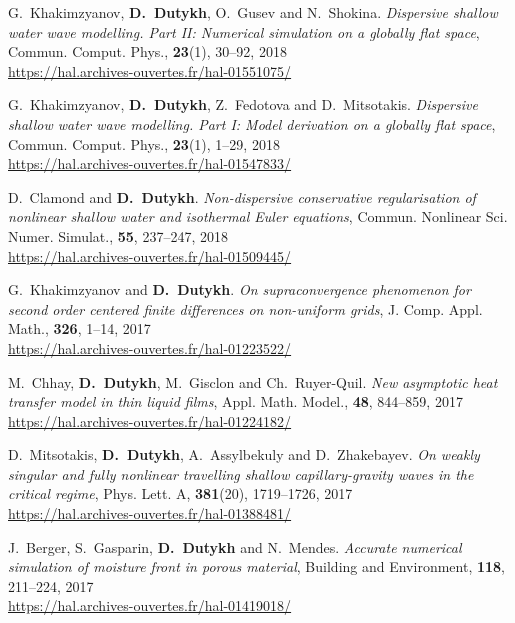 \begin{etaremune}
  \item G.~Khakimzyanov, \textbf{D.~Dutykh}, O.~Gusev and N.~Shokina. \textit{Dispersive shallow water wave modelling. Part II: Numerical simulation on a globally flat space}, Commun. Comput. Phys., \textbf{23}(1), 30--92, 2018 \\ %
  \url{https://hal.archives-ouvertes.fr/hal-01551075/}

  \item G.~Khakimzyanov, \textbf{D.~Dutykh}, Z.~Fedotova and D.~Mitsotakis. \textit{Dispersive shallow water wave modelling. Part I: Model derivation on a globally flat space}, Commun. Comput. Phys., \textbf{23}(1), 1--29, 2018 \\ %
  \url{https://hal.archives-ouvertes.fr/hal-01547833/}
  
  \item D.~Clamond and \textbf{D.~Dutykh}. \textit{Non-dispersive conservative regularisation of nonlinear shallow water and isothermal Euler equations}, Commun. Nonlinear Sci. Numer. Simulat., \textbf{55}, 237--247, 2018 \\ %
  \url{https://hal.archives-ouvertes.fr/hal-01509445/}
  
  
  \item G.~Khakimzyanov and \textbf{D.~Dutykh}. \textit{On supraconvergence phenomenon for second order centered finite differences on non-uniform grids}, J. Comp. Appl. Math., \textbf{326}, 1--14, 2017 \\ %
  \url{https://hal.archives-ouvertes.fr/hal-01223522/}

  \item M.~Chhay, \textbf{D.~Dutykh}, M.~Gisclon and Ch.~Ruyer-Quil. \textit{New asymptotic heat transfer model in thin liquid films}, Appl. Math. Model., \textbf{48}, 844--859, 2017 \\ %
  \url{https://hal.archives-ouvertes.fr/hal-01224182/}
  
  \item D.~Mitsotakis, \textbf{D.~Dutykh}, A.~Assylbekuly and D.~Zhakebayev. \textit{On weakly singular and fully nonlinear travelling shallow capillary-gravity waves in the critical regime}, Phys. Lett. A, \textbf{381}(20), 1719--1726, 2017 \\ %
  \url{https://hal.archives-ouvertes.fr/hal-01388481/}
  
  \item J.~Berger, S.~Gasparin, \textbf{D.~Dutykh} and N.~Mendes. \textit{Accurate numerical simulation of moisture front in porous material}, Building and Environment, \textbf{118}, 211--224, 2017 \\ %
  \url{https://hal.archives-ouvertes.fr/hal-01419018/}
  

\end{etaremune}
